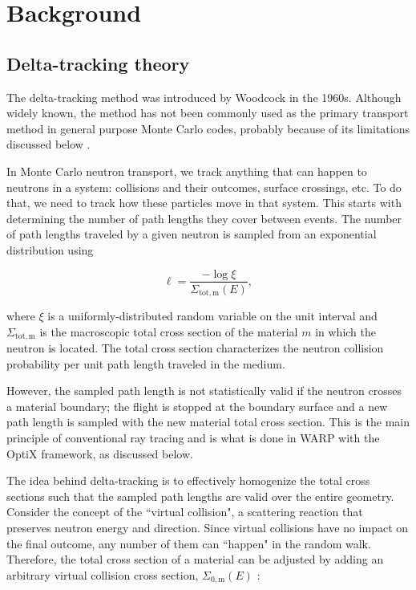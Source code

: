 \chapter{Background}

\section{Delta-tracking theory}

The delta-tracking method was introduced by Woodcock in the 1960s. Although widely known, the method has
not been commonly used as the primary transport method in general purpose Monte Carlo codes, probably 
because of its limitations discussed below \cite{serp_delta}.

In Monte Carlo neutron transport, we track anything that can happen to neutrons in a system: collisions 
and their outcomes, surface crossings, etc. To do that, we need to track how these particles move in that 
system. This starts with determining the number of path lengths they cover between events.
The number of path lengths traveled by a given neutron is sampled from an exponential distribution using

\begin{equation}
\ell = \frac{-\log\xi}{\Sigma_{\mathrm{tot,m}}(E)},
\end{equation}

\noindent where $\xi$ is a uniformly-distributed random variable on the unit interval and 
$\Sigma_{\mathrm{tot,m}}$ is the macroscopic total cross section of the material $m$ in which the neutron 
is located. The total cross section characterizes the neutron collision probability per unit path length 
traveled in the medium.

However, the sampled path length is not statistically valid if the neutron crosses a material boundary; 
the flight is stopped at the boundary surface and a new path length is sampled with the new material total
cross section. This is the main principle of conventional ray tracing \cite{serp_delta} and is what is
done in WARP with the OptiX framework, as discussed below.

The idea behind delta-tracking is to effectively homogenize the total cross sections such that the sampled
path lengths are valid over the entire geometry. Consider the concept of the ``virtual collision", a 
scattering reaction that preserves neutron energy and direction. Since virtual collisions have no impact 
on the final outcome, any number of them can ``happen" in the random walk. Therefore, the total cross 
section of a material can be adjusted by adding an arbitrary virtual collision cross section, 
$\Sigma_\mathrm{{0,m}}(E)$
\cite{serp_delta}:

